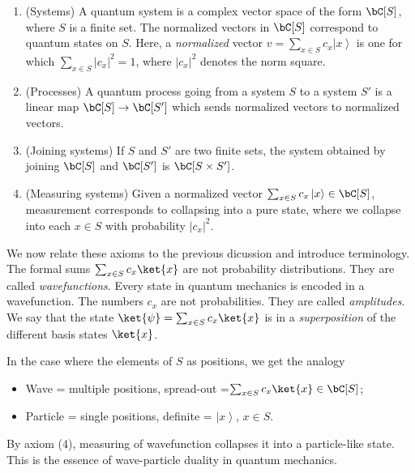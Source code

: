 \begin{defn} $\,$

\begin{enumerate}
\item (Systems) A quantum system is a complex vector space of the form $\bC[S]$, where $S$ is a finite set. The normalized vectors in $\bC[S]$ correspond to quantum states on $S$. Here, a {\em normalized} vector $v=\sum_{x\in S}c_x\left|x\right>$ is one for which $\sum_{x\in S}|c_x|^2=1$, where $|c_x|^2$ denotes the norm square.
\item (Processes) A quantum process going from a system $S$ to a system $S'$ is a linear map $\bC[S]\to \bC[S']$ which sends normalized vectors to normalized vectors.
\item (Joining systems) If $S$ and $S'$ are two finite sets, the system obtained by joining $\bC[S]$ and $\bC[S']$ is $\bC[S\times S']$.
\item (Measuring systems) Given a normalized vector $\sum_{x\in S}c_x \left |x\right>\in \bC[S]$, measurement corresponds to collapsing into a pure state, where we collapse into each $x\in S$ with probability $|c_x|^2$.
\end{enumerate}
\end{defn}

We now relate these axioms to the previous dicussion and introduce terminology. The formal sums $\sum_{x\in S}c_x\ket{x}$ are not probability distributions. They are called {\em wavefunctions}. Every state in quantum mechanics is encoded in a wavefunction. The numbers $c_x$ are not probabilities. They are called {\em amplitudes}. We say that the state $\ket{\psi}=\sum_{x\in S}c_x \ket{x}$ is in a {\em superposition} of the different basis states $\ket{x}$.

\begin{rem} In the case where the elements of $S$ as positions, we get the analogy

\begin{itemize}
\item Wave = multiple positions, spread-out =$\sum_{x\in S}c_x\ket{x}\in \bC[S]$;
\item Particle = single positions, definite = $\left|x\right>$, $x\in S$.
\end{itemize}

By axiom (4), measuring of wavefunction collapses it into a particle-like state. This is the essence of wave-particle duality in quantum mechanics.
\end{rem}


